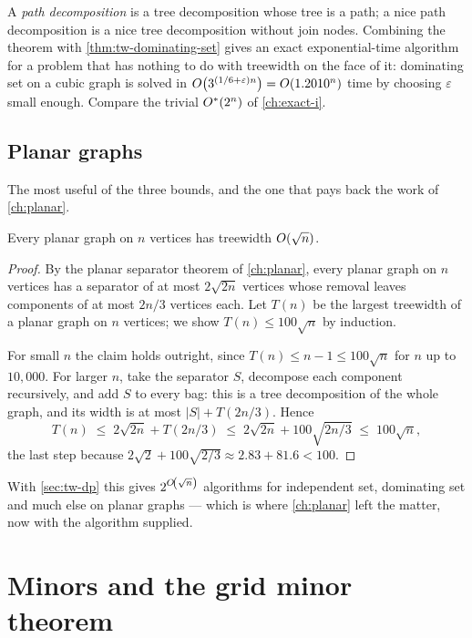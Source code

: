 A \emph{path decomposition} is a tree decomposition whose tree is a path; a nice
path decomposition is a nice tree decomposition without join nodes. Combining
the theorem with \cref{thm:tw-dominating-set} gives an exact exponential-time
algorithm for a problem that has nothing to do with treewidth on the face of
it: dominating set on a cubic graph is solved in
$O\!\left(3^{(1/6+\varepsilon)n}\right) = O\!\left(1.2010^n\right)$ time by choosing
$\varepsilon$ small enough. Compare the trivial $O^{*}(2^n)$ of
\cref{ch:exact-i}.

\subsection{Planar graphs}

The most useful of the three bounds, and the one that pays back the work of
\cref{ch:planar}.

\begin{theorem}\label{thm:tw-planar}
Every planar graph on $n$ vertices has treewidth $O\!\left(\sqrt n\right)$.
\end{theorem}

\begin{proof}
By the planar separator theorem of \cref{ch:planar}, every planar graph on $n$
vertices has a separator of at most $2\sqrt{2n}$ vertices whose removal leaves
components of at most $2n/3$ vertices each. Let $T(n)$ be the largest treewidth
of a planar graph on $n$ vertices; we show $T(n) \le 100\sqrt n$ by induction.

For small $n$ the claim holds outright, since $T(n) \le n-1 \le 100\sqrt n$ for
$n$ up to $10{,}000$. For larger $n$, take the separator $S$, decompose each
component recursively, and add $S$ to every bag: this is a tree decomposition
of the whole graph, and its width is at most $|S| + T(2n/3)$. Hence
\[ T(n) \;\le\; 2\sqrt{2n} + T(2n/3) \;\le\; 2\sqrt{2n} + 100\sqrt{2n/3}
        \;\le\; 100\sqrt{n}, \]
the last step because $2\sqrt2 + 100\sqrt{2/3} \approx 2.83 + 81.6 < 100$.
\end{proof}

With \cref{sec:tw-dp} this gives $2^{O\!\left(\sqrt n\right)}$ algorithms for
independent set, dominating set and much else on planar graphs --- which is
where \cref{ch:planar} left the matter, now with the algorithm supplied.

\section{Minors and the grid minor theorem}
\label{sec:tw-minors}

